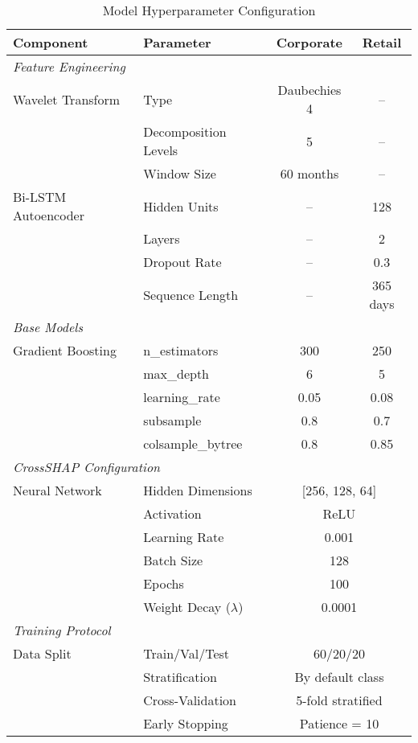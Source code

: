 \documentclass[a4paper,11pt,twoside]{article}
\newcommand{\0}{\Bf{0}}
\theoremstyle{definition}
\begin{document}
\begin{table}[H]
\centering
\caption{Model Hyperparameter Configuration}
\label{tab:hyperparameters}
\begin{tabular}{llcc}
\toprule
\textbf{Component} & \textbf{Parameter} & \textbf{Corporate} & \textbf{Retail} \\
\midrule
\multicolumn{4}{l}{\textit{Feature Engineering}} \\
Wavelet Transform & Type & Daubechies 4 & -- \\
& Decomposition Levels & 5 & -- \\
& Window Size & 60 months & -- \\
Bi-LSTM Autoencoder & Hidden Units & -- & 128 \\
& Layers & -- & 2 \\
& Dropout Rate & -- & 0.3 \\
& Sequence Length & -- & 365 days \\
\midrule
\multicolumn{4}{l}{\textit{Base Models}} \\
Gradient Boosting & n\_estimators & 300 & 250 \\
& max\_depth & 6 & 5 \\
& learning\_rate & 0.05 & 0.08 \\
& subsample & 0.8 & 0.7 \\
& colsample\_bytree & 0.8 & 0.85 \\
\midrule
\multicolumn{4}{l}{\textit{CrossSHAP Configuration}} \\
Neural Network & Hidden Dimensions & \multicolumn{2}{c}{[256, 128, 64]} \\
& Activation & \multicolumn{2}{c}{ReLU} \\
& Learning Rate & \multicolumn{2}{c}{0.001} \\
& Batch Size & \multicolumn{2}{c}{128} \\
& Epochs & \multicolumn{2}{c}{100} \\
& Weight Decay ($\lambda$) & \multicolumn{2}{c}{0.0001} \\
\midrule
\multicolumn{4}{l}{\textit{Training Protocol}} \\
Data Split & Train/Val/Test & \multicolumn{2}{c}{60/20/20} \\
& Stratification & \multicolumn{2}{c}{By default class} \\
& Cross-Validation & \multicolumn{2}{c}{5-fold stratified} \\
& Early Stopping & \multicolumn{2}{c}{Patience = 10} \\
\bottomrule
\end{tabular}
\end{table}
\end{document}
